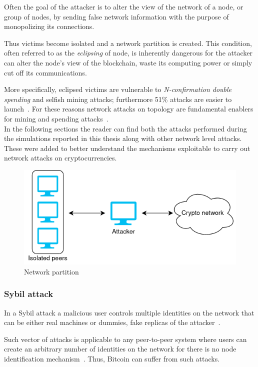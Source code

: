 \documentclass[12pt, letterpaper, twoside]{article}
\begin{document}
Often the goal of the attacker is to alter the view of the network of a node, or group of nodes, by sending false network information with the purpose of monopolizing its connections.

Thus victims become isolated and a network partition is created. This condition, often referred to as the \textit{eclipsing} of node, is inherently dangerous for the attacker can alter the node's view of the blockchain, waste its computing power or simply cut off its communications.

More specifically, eclipsed victims are vulnerable to \textit{N-confirmation double spending} and selfish mining attacks; furthermore 51\% attacks are easier to launch~\cite{eclipseatk}. For these reasons network attacks on topology are fundamental enablers for mining and spending attacks~\cite{dotan2020surveychallenges}.\\

In the following sections the reader can find both the attacks performed during the simulations reported in this thesis along with other network level attacks. These were added to better understand the mechanisms exploitable to carry out network attacks on cryptocurrencies.

\begin{figure}[h!]
	\includegraphics[width=.55\textwidth]{pict/network-partition.png}
	\centering
	\caption{Network partition}
	\label{fig:net-part}
\end{figure}


\subsubsection{Sybil attack}\label{sec:sybil}
In a Sybil attack a malicious user controls multiple identities on the network that can be either real machines or dummies, fake replicas of the attacker~\cite{douceur2002sybil}.

Such vector of attacks is applicable to any peer-to-peer system where users can create an arbitrary number of identities on the network for there is no node identification mechanism~\cite{kedziora-sybil-ledgers}. Thus, Bitcoin can suffer from such attacks.
\end{document}
